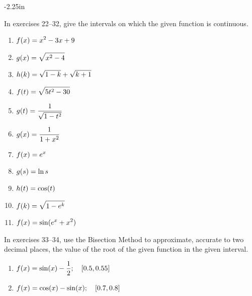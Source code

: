 \begin{adjustwidth*}{}{-2.25in}
\begin{multicols*}{2}
\vspace{.5cm}

\noindent In exercises 22--32, give the intervals on which the given function is continuous.

\begin{enumerate}[1),start=22]
\item $\displaystyle f(x) = x^2-3x+9$
\item $\displaystyle g(x) = \sqrt{x^2-4}$
\item $\displaystyle h(k) = \sqrt{1-k}+\sqrt{k+1}$
\item $\displaystyle f(t) = \sqrt{5t^2-30}$
\item $\displaystyle g(t) = \frac{1}{\sqrt{1-t^2}}$
\item $\displaystyle g(x) = \frac{1}{1+x^2}$
\item $\displaystyle f(x) = e^x$
\item $\displaystyle g(s) = \ln s$
\item $\displaystyle h(t) = \cos(t)$
\item $\displaystyle f(k) = \sqrt{1-e^k}$
\item $\displaystyle f(x) = \sin(e^x+x^2)$
\end{enumerate}

\vspace{.5cm}

\noindent In exercises 33--34, use the Bisection Method to approximate, accurate to two decimal places, the value of the root of the given function in the given interval.

\begin{enumerate}[1),start=33]
\item $\displaystyle f(x) = \sin(x) - \frac{1}{2}; \quad [0.5, 0.55]$
\item $\displaystyle f(x) = \cos(x) - \sin(x); \quad [0.7, 0.8]$
\end{enumerate}

\end{multicols*}
\end{adjustwidth*}
\afterexercises